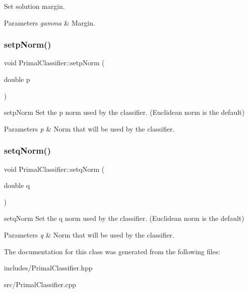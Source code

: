 Set solution margin. 


\begin{DoxyParams}{Parameters}
{\em gamma} & Margin. \\
\hline
\end{DoxyParams}
\mbox{\label{class_primal_classifier_a30cd3926ea5e7341920dcb5480567af1}} 
\subsubsection{\texorpdfstring{setp\+Norm()}{setpNorm()}}
{\footnotesize\ttfamily void Primal\+Classifier\+::setp\+Norm (\begin{DoxyParamCaption}\item[{double}]{p }\end{DoxyParamCaption})}



setp\+Norm Set the p norm used by the classifier. (Euclidean norm is the default) 


\begin{DoxyParams}{Parameters}
{\em p} & Norm that will be used by the classifier. \\
\hline
\end{DoxyParams}
\mbox{\label{class_primal_classifier_a22ca554e2a8d33d43c813b6b9b3e4a6a}} 
\subsubsection{\texorpdfstring{setq\+Norm()}{setqNorm()}}
{\footnotesize\ttfamily void Primal\+Classifier\+::setq\+Norm (\begin{DoxyParamCaption}\item[{double}]{q }\end{DoxyParamCaption})}



setq\+Norm Set the q norm used by the classifier. (Euclidean norm is the default) 


\begin{DoxyParams}{Parameters}
{\em q} & Norm that will be used by the classifier. \\
\hline
\end{DoxyParams}


The documentation for this class was generated from the following files\+:\begin{DoxyCompactItemize}
\item 
includes/Primal\+Classifier.\+hpp\item 
src/Primal\+Classifier.\+cpp\end{DoxyCompactItemize}
